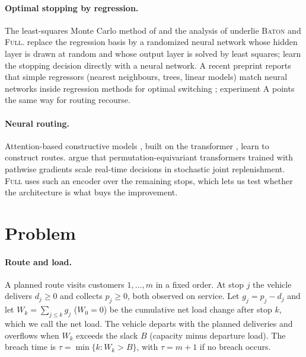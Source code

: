 \documentclass[trsc,dblanonrev]{informs4}
\newcommand{\Full}{\textsc{Full}}
\newcommand{\Baton}{\textsc{Baton}}
\begin{document}
\paragraph{Optimal stopping by regression.} The least-squares Monte Carlo
method of \citet{longstaff2001valuing} and the analysis of
\citet{tsitsiklis2001regression} underlie \Baton{} and \Full{}.
\citet{herrera2024optimal} replace the regression basis by a randomized neural
network whose hidden layer is drawn at random and whose output layer is solved
by least squares; \citet{becker2019deep} learn the stopping decision directly
with a neural network. A recent preprint reports that simple regressors
(nearest neighbours, trees, linear models) match neural networks inside
regression methods for optimal switching \citep{andersson2026effectiveness};
experiment A points the same way for routing recourse.

\paragraph{Neural routing.} Attention-based constructive models
\citep{kool2019attention, nazari2018reinforcement, kwon2020pomo}, built on the
transformer \citep{vaswani2017attention}, learn to construct routes.
\citet{liu2026ortransformer} argue that permutation-equivariant transformers
trained with pathwise gradients scale real-time decisions in stochastic joint
replenishment. \Full{} uses such an encoder over the remaining stops, which
lets us test whether the architecture is what buys the improvement.

\section{Problem}\label{sec:problem}

\paragraph{Route and load.} A planned route visits customers $1,\dots,m$ in a
fixed order. At stop $j$ the vehicle delivers $d_j \ge 0$ and collects
$p_j \ge 0$, both observed on service. Let $g_j = p_j - d_j$ and let
$W_k = \sum_{j \le k} g_j$ ($W_0 = 0$) be the cumulative net load change after
stop $k$, which we call the net load. The vehicle departs with the planned
deliveries and overflows when $W_k$ exceeds the slack $B$ (capacity minus
departure load). The breach time is $\tau = \min\{k : W_k > B\}$, with
$\tau = m+1$ if no breach occurs.
\end{document}
